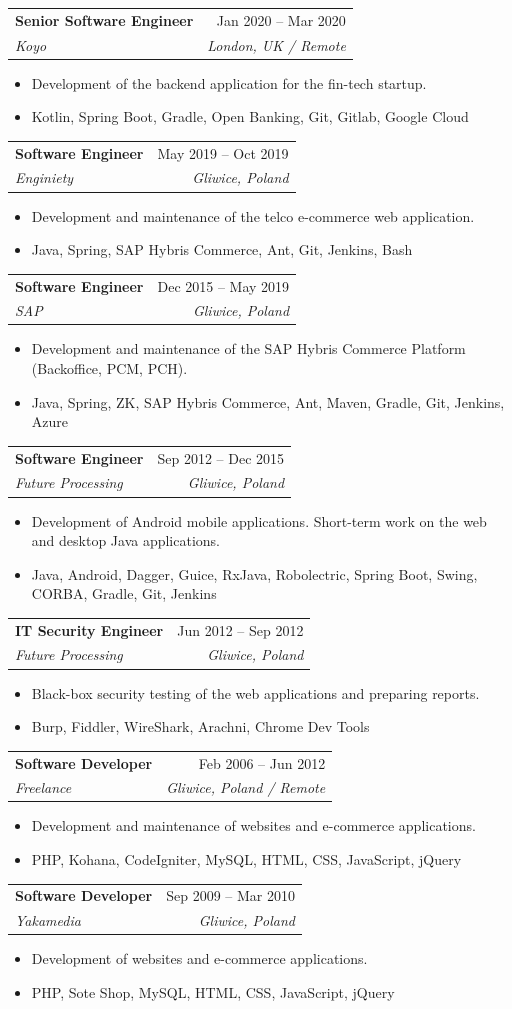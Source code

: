 \documentclass[letterpaper,11pt]{article}
\makeatletter
\newcommand{\resumeItem}[1]{
  \item\small{
    {#1 \vspace{-2pt}}
  }
}
\newcommand{\resumeSubheading}[4]{
  \vspace{-2pt}\item
    \begin{tabular*}{0.97\textwidth}[t]{l@{\extracolsep{\fill}}r}
      \textbf{#1} & #2 \\
      \textit{\small#3} & \textit{\small #4} \\
    \end{tabular*}\vspace{-7pt}
}
\newcommand{\resumeItemListStart}{\begin{itemize}}
\newcommand{\resumeItemListEnd}{\end{itemize}\vspace{-5pt}}
\makeatother
\begin{document}
    \resumeSubheading
      {Senior Software Engineer}{Jan 2020 -- Mar 2020}
      {Koyo}{London, UK / Remote}
      \resumeItemListStart
        \resumeItem{Development of the backend application for the fin-tech startup.}
        \resumeItem{Kotlin, Spring Boot, Gradle, Open Banking, Git, Gitlab, Google Cloud}
    \resumeItemListEnd

    \resumeSubheading
      {Software Engineer}{May 2019 -- Oct 2019}
      {Enginiety}{Gliwice, Poland}
      \resumeItemListStart
        \resumeItem{Development and maintenance of the telco e-commerce web application.}
        \resumeItem{Java, Spring, SAP Hybris Commerce, Ant, Git, Jenkins, Bash}
    \resumeItemListEnd

    \resumeSubheading
      {Software Engineer}{Dec 2015 -- May 2019}
      {SAP}{Gliwice, Poland}
      \resumeItemListStart
        \resumeItem{Development and maintenance of the SAP Hybris Commerce Platform (Backoffice, PCM, PCH).}
        \resumeItem{Java, Spring, ZK, SAP Hybris Commerce, Ant, Maven, Gradle, Git, Jenkins, Azure}
    \resumeItemListEnd

    \resumeSubheading
      {Software Engineer}{Sep 2012 -- Dec 2015}
      {Future Processing}{Gliwice, Poland}
      \resumeItemListStart
        \resumeItem{Development of Android mobile applications. Short-term work on the web and desktop Java applications.}
        \resumeItem{Java, Android, Dagger, Guice, RxJava, Robolectric, Spring Boot, Swing, CORBA, Gradle, Git, Jenkins}
    \resumeItemListEnd

    \resumeSubheading
      {IT Security Engineer}{Jun 2012 -- Sep 2012}
      {Future Processing}{Gliwice, Poland}
      \resumeItemListStart
        \resumeItem{Black-box security testing of the web applications and preparing reports.}
        \resumeItem{Burp, Fiddler, WireShark, Arachni, Chrome Dev Tools}
    \resumeItemListEnd

    \resumeSubheading
      {Software Developer}{Feb 2006 -- Jun 2012}
      {Freelance}{Gliwice, Poland / Remote}
      \resumeItemListStart
        \resumeItem{Development and maintenance of websites and e-commerce applications.}
        \resumeItem{PHP, Kohana, CodeIgniter, MySQL, HTML, CSS, JavaScript, jQuery}
    \resumeItemListEnd

    \resumeSubheading
      {Software Developer}{Sep 2009 -- Mar 2010}
      {Yakamedia}{Gliwice, Poland}
      \resumeItemListStart
        \resumeItem{Development of websites and e-commerce applications.}
        \resumeItem{PHP, Sote Shop, MySQL, HTML, CSS, JavaScript, jQuery}
    \resumeItemListEnd
\end{document}
